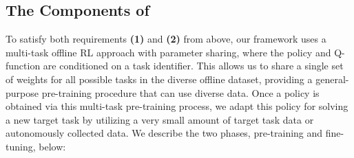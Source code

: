 \subsection{The Components of \ptrmethodname}
\label{sec:algorithm}

To satisfy both requirements \textbf{(1)} and \textbf{(2)} from above, our framework uses a multi-task offline RL approach with parameter sharing, where the policy and Q-function are conditioned on a task identifier. This allows us to share a single set of weights for all possible tasks in the diverse offline dataset, providing a general-purpose pre-training procedure that can use diverse data. 
Once a policy is obtained via this multi-task pre-training process, we adapt this policy for solving a new target task by utilizing a very small amount of target task data or autonomously collected data. We describe the two phases, pre-training and fine-tuning, below:

~

